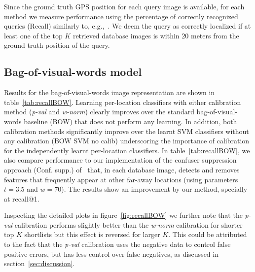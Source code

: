   Since the ground truth GPS position for each query image is available, for each method we measure performance using the percentage of correctly recognized queries (Recall) similarly to, e.g.,~\cite{Chen11,Knopp2010,Sattler-BMVC12}. We deem the query as correctly localized if at least one of the top $K$ retrieved database images is within $20$ meters from the ground truth position of the query. 


  \subsection{Bag-of-visual-words model}
  \label{sec:bow_results}
%
    Results for the bag-of-visual-words image representation are shown in table~\ref{tab:recallBOW}.  
    Learning per-location classifiers with either calibration method (\emph{p-val} and \emph{w-norm}) clearly improves over the standard bag-of-visual-words baseline (BOW) that does not perform any learning. In addition, both calibration methods significantly improve over the learnt SVM classifiers without any calibration (BOW SVM no calib) underscoring the importance of calibration for the independently learnt per-location classifiers.  
    {
      In table~\ref{tab:recallBOW}, we also compare performance to our implementation of the confuser suppression approach (Conf. supp.) of~\cite{Knopp2010} that, in each database image, detects and removes features that frequently appear at other far-away locations (using parameters $t=3.5$ and $w=70$). The results show an improvement by our method, specially at recall@1.
    }

    Inspecting the detailed plots in figure~\ref{fig:recallBOW} we further note that the  \emph{p-val} calibration performs slightly better than the \emph{w-norm} calibration for shorter top $K$ shortlists but this effect is reversed for larger $K$. This could be attributed to the fact that the \emph{p-val} calibration uses the negative data to control false positive errors, but has less control over false negatives, as discussed in section~\ref{sec:discussion}. 


